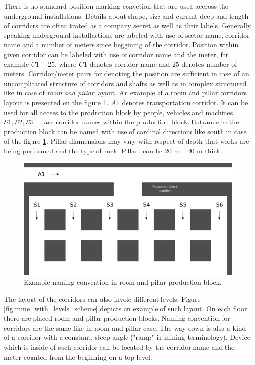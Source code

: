 \documentclass[../main.tex]{subfiles}
\begin{document}
There is no standard position marking convetion that are used accross the underground installations. Details about shape, size and current deep and length of corridors are often trated as a company secret as well as their labels. Generally speaking underground installactions are labeled with use of sector name, corridor name and a number of meters since beggining of the corridor. Position within given corridor can be labeled with use of corridor name and the meter, for example $C1-25$, where $C1$ denotes corridor name and $25$ denotes number of meters. Corridor/meter pairs for denoting the position are sufficient in case of an uncomplicated structure of corridors and shafts as well as in complex structured like in case of \textit{room and pillar} layout. An example of a room and pillar corridors layout is presented on the figure \ref{fig:room_and_pillar_scheme}. $A1$ denotes transportation corridor. It can be used for all access to the production block by people, vehicles and machines. $S1, S2, S3, ...$ are corridor names within the production block. Entrance to the production block can be named with use of cardinal directions like south in case of the figure \ref{fig:room_and_pillar_scheme}. Pillar diamensions may vary with respect of depth that works are being performed and the type of rock. Pillars can be 20 m -- 40 m thick.

\begin{figure}[ht]
\includegraphics[width=\textwidth]{pictures/room_and_pillar_scheme.pdf}
\centering
\caption{Example naming convention in room and pillar production block.}
\label{fig:room_and_pillar_scheme}
\end{figure}

The layout of the corridors can also invole different levels. Figure \ref{fig:mine_with_levels_scheme} depicts an example of such layout. On each floor there are placed room and pillar production blocks. Naming convention for corridors are the same like in room and pillar case. The way down is also a kind of a corridor with a constant, steep angle ("ramp" in mining terminology). Device which is inside of such corridor can be located by the corridor name and the meter counted from the beginning on a top level.
\end{document}
